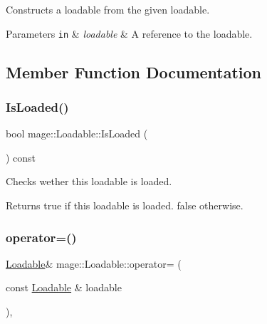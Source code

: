 Constructs a loadable from the given loadable.


\begin{DoxyParams}[1]{Parameters}
\mbox{\tt in}  & {\em loadable} & A reference to the loadable. \\
\hline
\end{DoxyParams}


\subsection{Member Function Documentation}
\hypertarget{classmage_1_1_loadable_a53cfa5beb9b44bbcda0d6166a54b8cb6}{}\label{classmage_1_1_loadable_a53cfa5beb9b44bbcda0d6166a54b8cb6} 
\subsubsection{\texorpdfstring{Is\+Loaded()}{IsLoaded()}}
{\footnotesize\ttfamily bool mage\+::\+Loadable\+::\+Is\+Loaded (\begin{DoxyParamCaption}{ }\end{DoxyParamCaption}) const}

Checks wether this loadable is loaded.

\begin{DoxyReturn}{Returns}
{\ttfamily true} if this loadable is loaded. {\ttfamily false} otherwise. 
\end{DoxyReturn}
\hypertarget{classmage_1_1_loadable_a82277616525b6ed9b1e19fd2dcdb4c0d}{}\label{classmage_1_1_loadable_a82277616525b6ed9b1e19fd2dcdb4c0d} 
\subsubsection{\texorpdfstring{operator=()}{operator=()}\hspace{0.1cm}{\footnotesize\ttfamily [1/2]}}
{\footnotesize\ttfamily \hyperlink{classmage_1_1_loadable}{Loadable}\& mage\+::\+Loadable\+::operator= (\begin{DoxyParamCaption}\item[{const \hyperlink{classmage_1_1_loadable}{Loadable} \&}]{loadable }\end{DoxyParamCaption})\hspace{0.3cm}{\ttfamily [protected]}, {\ttfamily [default]}}

